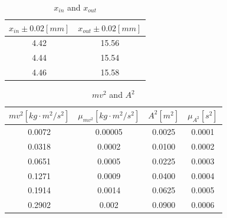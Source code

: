 \documentclass[11pt,a4paper]{article}
\begin{document}
                            \begin{table}[H]
                                \centering
                                \begin{tabular}{|c|c|}\hline
                                $x_{in}\pm 0.02[mm]$ & $x_{out}\pm 0.02[mm]$ \\\hline
                                4.42                 & 15.56                 \\\hline
                                4.44                 & 15.54                 \\\hline
                                4.46                 & 15.58          \\\hline      
                                \end{tabular}
                                \caption{$x_{in}$ and $x_{out}$}
                                \label{xinxout}
                                \end{table}
                            \begin{table}[H]
                                \centering
                                \begin{tabular}{|c|c|c|c|}
                                \hline
                                $mv^2[kg\cdot m^2/s^2] $        & $\mu_{mv^2}[kg\cdot m^2/s^2]$  & $A^2[m^2]$ & $\mu_{A^2}[s^2]$ \\ \hline
                                0.0072 & 0.00005 & 0.0025               & 0.0001 \\ \hline
                                0.0318 & 0.0002  & 0.0100               & 0.0002 \\ \hline
                                0.0651 & 0.0005  & 0.0225               & 0.0003 \\ \hline
                                0.1271 & 0.0009  & 0.0400               & 0.0004 \\ \hline
                                0.1914 & 0.0014  & 0.0625               & 0.0005 \\ \hline
                                0.2902 & 0.002   & 0.0900               & 0.0006 \\ \hline
                                \end{tabular}
                                \caption{$mv^2$ and $A^2$}
                                \label{valuemv2a2}
                                \end{table}
\end{document}
